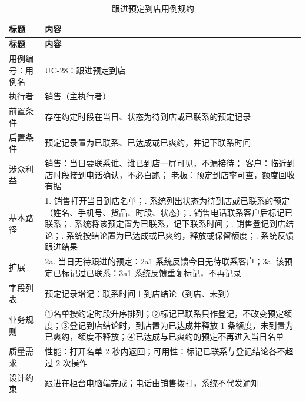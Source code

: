 {\small
\begin{longtable}{@{}L{3.0cm} L{12.3cm}@{}}
\caption{跟进预定到店用例规约}\label{tab:uc-28}\\
\toprule
\textbf{标题} & \textbf{内容} \\
\midrule
\endfirsthead
\toprule
\textbf{标题} & \textbf{内容} \\
\midrule
\endhead
用例编号：用例名 & UC-28：跟进预定到店 \\
\midrule
执行者 & 销售（主执行者） \\
\midrule
前置条件 & 存在约定时段在当日、状态为待到店或已联系的预定记录 \\
\midrule
后置条件 & 预定记录置为已联系、已达成或已爽约，并记下联系时间 \\
\midrule
涉众利益 & 销售：当日要联系谁、谁已到店一屏可见，不漏接待；\newline
客户：临近到店时段接到电话确认，不必白跑；\newline
老板：预定到店率可查，额度回收有据 \\
\midrule
基本路径 & 1. 销售打开当日到店名单；. 系统列出状态为待到店或已联系的预定（姓名、手机号、货品、时段、状态）；. 销售电话联系客户后标记已联系；. 系统将该预定置为已联系，记下联系时间；. 销售登记到店结论；. 系统按结论置为已达成或已爽约，释放或保留额度；. 系统反馈跟进结果 \\
\midrule
扩展 & 2a. 当日无待跟进的预定：2a1 系统反馈今日无待联系客户；\newline 3a. 该预定已标记过已联系：3a1 系统反馈重复标记，不再记录 \\
\midrule
字段列表 & 预定记录增记：联系时间＋到店结论（到店、未到） \\
\midrule
业务规则 & ①名单按约定时段升序排列；\newline ②标记已联系只作登记，不改变预定额度；\newline ③登记到店结论时，到店置为已达成并释放 1 条额度，未到置为已爽约，额度不释放；\newline ④已达成与已爽约的预定不再进入当日名单 \\
\midrule
质量需求 & 性能：打开名单 2 秒内返回；可用性：标记已联系与登记结论各不超过 2 次操作 \\
\midrule
设计约束 & 跟进在柜台电脑端完成；电话由销售拨打，系统不代发通知 \\
\midrule
\bottomrule
\end{longtable}}



